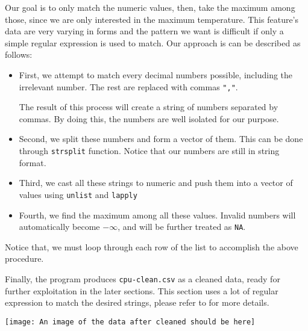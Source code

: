 
Our goal is to only match the numeric values, then, take the maximum among those, since we are only interested in the maximum temperature.
This feature's data are very varying in forms and the pattern we want is difficult if only a simple regular expression is used to match.
Our approach is can be described as follows:

\begin{itemize}
    \item First, we attempt to match every decimal numbers possible, including the irrelevant number. The rest are replaced with commas \verb|","|.
    
    The result of this process will create a string of numbers separated by commas. By doing this, the numbers are well isolated for our purpose.

    \item Second, we split these numbers and form a vector of them. This can be done through \texttt{strsplit} function. Notice that our numbers
    are still in string format.

    \item Third, we cast all these strings to numeric and push them into a vector of values using \texttt{unlist} and \texttt{lapply}
    
    \item Fourth, we find the maximum among all these values. Invalid numbers will automatically become \(-\infty\), and will be further treated as \texttt{NA}.

\end{itemize}

Notice that, we must loop through each row of the list to accomplish the above procedure.

Finally, the program produces \verb|cpu-clean.csv| as a cleaned data, ready for further exploitation in the later sections. This section uses a lot of regular expression
to match the desired strings, please refer to  for more details.

\texttt{[image: An image of the data after cleaned should be here]}